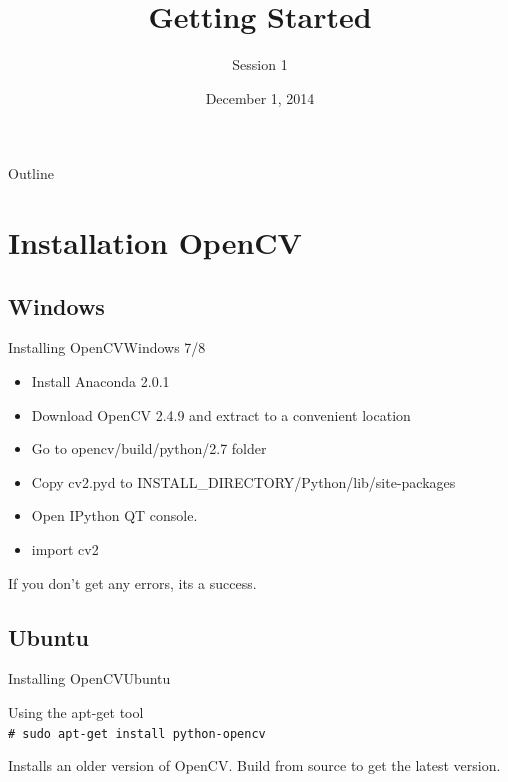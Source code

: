 \documentclass{beamer}
\title{Getting Started}
\subtitle{Session 1}
\institute[Computer Vision Group] %
{
  Computer Vision Group\\
  IIT Madras
}
\date{December 1, 2014}
\newcommand{\shellcmd}[1]{\\\indent\indent\texttt{\footnotesize\# #1}\\}  %
\begin{document}
\begin{frame}
  \titlepage
\end{frame}

\begin{frame}{Outline}
  \tableofcontents[sectionstyle=show/show,subsectionstyle=show/show,subsubsectionstyle=hide]
\end{frame}

\section{Installation OpenCV}

\subsection{Windows}

\begin{frame}{Installing OpenCV}{Windows 7/8}
  \begin{itemize}
  \item {
    Install Anaconda 2.0.1
  }
  \item {
    Download OpenCV 2.4.9 and extract to a convenient location
  }
  \item{
    Go to opencv/build/python/2.7 folder
  }
  \item{
    Copy cv2.pyd to INSTALL\_DIRECTORY/Python/lib/site-packages
  }
  \item{
    Open IPython QT console.
  }
  \item{
    import cv2
  }
  \end{itemize}
  If you don't get any errors, its a success.
\end{frame}

\subsection{Ubuntu}

\begin{frame}{Installing OpenCV}{Ubuntu}
\begin{block}{Using the apt-get tool}
\shellcmd{sudo apt-get install python-opencv}
\end{block}


Installs an older version of OpenCV. Build from source to get the latest version.
\end{frame}
\end{document}
